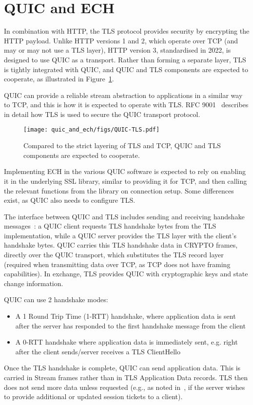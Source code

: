 \section{QUIC and ECH}

In combination with HTTP, the TLS protocol provides security by encrypting the HTTP payload.
Unlike HTTP versions 1 and 2, which operate over TCP (and may or may not use a TLS layer),
HTTP version 3, standardised in 2022, is designed to use QUIC as a transport.
Rather than forming a separate layer, TLS is tightly integrated with QUIC, and QUIC and TLS components are expected to cooperate, as illustrated in Figure~\ref{fig:quic-tls}.

QUIC can provide a reliable stream abstraction to applications in a similar way to TCP, and this is how it is expected to operate with TLS.
RFC 9001~\cite{rfc9001} describes in detail how TLS is used to secure the QUIC transport protocol.

\begin{figure}[h]
    \centering
    \texttt{[image: quic\_and\_ech/figs/QUIC-TLS.pdf]}
    \caption{Compared to the strict layering of TLS and TCP, QUIC and TLS components are expected to cooperate.}
    \label{fig:quic-tls}
\end{figure}

Implementing ECH in the various QUIC software is expected to rely on enabling it in the underlying SSL library, similar to providing it for TCP, and then calling the relevant functions from the library on connection setup.
Some differences exist, as QUIC also needs to configure TLS.

The interface between QUIC and TLS includes sending and receiving handshake messages~\cite{rfc9001}:
a QUIC client requests TLS handshake bytes from the TLS implementation, while a QUIC server provides the TLS layer with the client's handshake bytes. QUIC carries this TLS handshake data in CRYPTO frames, directly over the QUIC transport, which substitutes the TLS record layer (required when transmitting data over TCP, as TCP does not have framing capabilities).
In exchange, TLS provides QUIC with cryptographic keys and state change information.

QUIC can use 2 handshake modes:
\begin{itemize}
    \item  A 1 Round Trip Time (1-RTT) handshake, where application data is sent after the server has responded to the first handshake message from the client
     \item A 0-RTT handshake where application data is immediately sent, e.g. right after the client sends/server receives a TLS ClientHello
\end{itemize}

Once the TLS handshake is complete, QUIC can send application data. This is carried in Stream frames rather than in TLS Application Data records. TLS then does not send more data unless requested (e.g., as noted in~\cite{rfc9001}, if the server wishes to provide additional or updated session tickets to a client).
